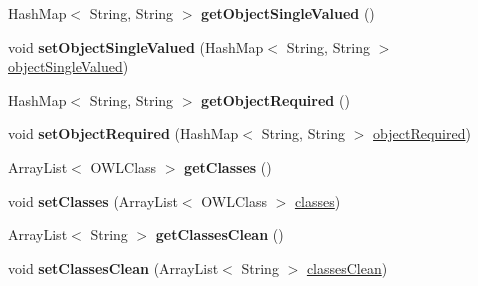 \begin{DoxyCompactItemize}
\item 
\hypertarget{class_ontology_1_1_object_property_af141c1f8e25d7f61b025d79873da48a8}{
HashMap$<$ String, String $>$ {\bfseries getObjectSingleValued} ()}
\label{class_ontology_1_1_object_property_af141c1f8e25d7f61b025d79873da48a8}

\item 
\hypertarget{class_ontology_1_1_object_property_aa6077c196fa7e1d6a13f2414be7309dd}{
void {\bfseries setObjectSingleValued} (HashMap$<$ String, String $>$ \hyperlink{class_ontology_1_1_object_property_ae17f30505dd7960fa544de3063ccdb10}{objectSingleValued})}
\label{class_ontology_1_1_object_property_aa6077c196fa7e1d6a13f2414be7309dd}

\item 
\hypertarget{class_ontology_1_1_object_property_a48e78e0e75309e9761299fd5c30ad194}{
HashMap$<$ String, String $>$ {\bfseries getObjectRequired} ()}
\label{class_ontology_1_1_object_property_a48e78e0e75309e9761299fd5c30ad194}

\item 
\hypertarget{class_ontology_1_1_object_property_a9b1c17a2276ae9ec42dcf98da9fd4208}{
void {\bfseries setObjectRequired} (HashMap$<$ String, String $>$ \hyperlink{class_ontology_1_1_object_property_a1bb591de60f79ef7fc2f194c93dcff92}{objectRequired})}
\label{class_ontology_1_1_object_property_a9b1c17a2276ae9ec42dcf98da9fd4208}

\item 
\hypertarget{class_ontology_1_1_object_property_a5ae8ddb994a32655414511adec6a8dbb}{
ArrayList$<$ OWLClass $>$ {\bfseries getClasses} ()}
\label{class_ontology_1_1_object_property_a5ae8ddb994a32655414511adec6a8dbb}

\item 
\hypertarget{class_ontology_1_1_object_property_a935cc971e4c56212fd10ddbc3d81d8bb}{
void {\bfseries setClasses} (ArrayList$<$ OWLClass $>$ \hyperlink{class_ontology_1_1_object_property_a0fb4e9a0cfa7cb785880cd19764cb80c}{classes})}
\label{class_ontology_1_1_object_property_a935cc971e4c56212fd10ddbc3d81d8bb}

\item 
\hypertarget{class_ontology_1_1_object_property_a32263c437748315c900e2c5226d00323}{
ArrayList$<$ String $>$ {\bfseries getClassesClean} ()}
\label{class_ontology_1_1_object_property_a32263c437748315c900e2c5226d00323}

\item 
\hypertarget{class_ontology_1_1_object_property_a69db404679dc64a382ab8cbcb495f1d1}{
void {\bfseries setClassesClean} (ArrayList$<$ String $>$ \hyperlink{class_ontology_1_1_object_property_aa8e9d767788209520016911f53bb0f58}{classesClean})}
\label{class_ontology_1_1_object_property_a69db404679dc64a382ab8cbcb495f1d1}


\end{DoxyCompactItemize}
